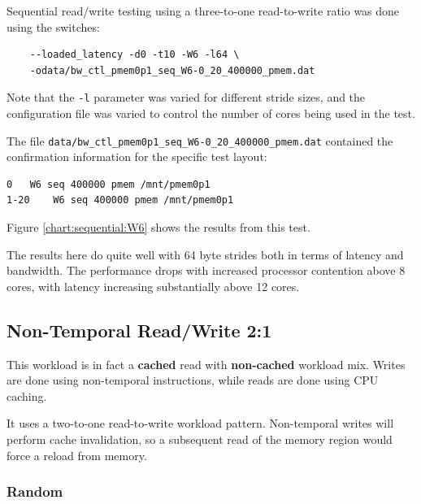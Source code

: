 Sequential read/write testing using a three-to-one read-to-write ratio was 
done using the switches:

\begin{verbatim}
    --loaded_latency -d0 -t10 -W6 -l64 \
    -odata/bw_ctl_pmem0p1_seq_W6-0_20_400000_pmem.dat
\end{verbatim}

Note that the \verb+-l+ parameter was varied for different
stride sizes, and the configuration file was varied to control
the number of cores being used in the test.

The file \verb+data/bw_ctl_pmem0p1_seq_W6-0_20_400000_pmem.dat+ contained the confirmation information
for the specific test layout:

\begin{verbatim}
0	W6 seq 400000 pmem /mnt/pmem0p1
1-20	W6 seq 400000 pmem /mnt/pmem0p1
\end{verbatim}

Figure \ref{chart:sequential:W6} shows the results from this test.

The results here do quite well with 64 byte strides both in
terms of latency and bandwidth.  The performance drops with
increased processor contention above 8 cores, with latency
increasing substantially above 12 cores.

\subsection{Non-Temporal Read/Write 2:1}

This workload is in fact a \textbf{cached} read with 
\textbf{non-cached} workload mix.  Writes are done using
non-temporal instructions, while reads are done using CPU
caching.

It uses a two-to-one read-to-write workload pattern. Non-temporal
writes will perform cache invalidation, so a subsequent read of
the memory region would force a reload from memory.

\subsubsection{Random}

